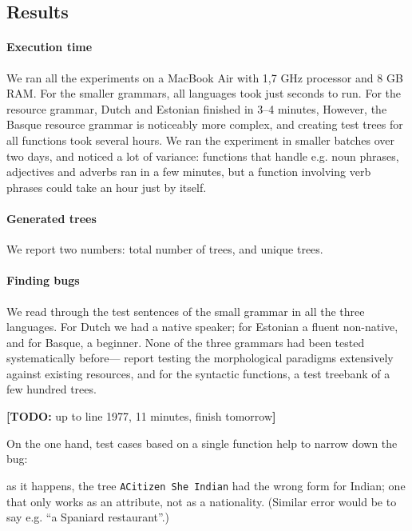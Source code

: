 \documentclass[11pt]{article}
\def\t#1{\texttt{#1}}
\newcommand{\todo}[1]{{\color{cyan}\textbf{[TODO: }#1\textbf{]}}}
\begin{document}
\subsection{Results}

\paragraph{Execution time} We ran all the experiments on a MacBook Air with 1,7 GHz processor and 8 GB RAM.
For the smaller grammars, all languages took just
seconds to run. For the resource grammar, Dutch and Estonian finished in
3--4 minutes,
However, the Basque resource grammar is noticeably more complex, and
creating test trees for all functions took several hours. We ran the
experiment in smaller batches over two days, and noticed a lot of
variance: functions that handle e.g. noun phrases, adjectives and
adverbs ran in a few minutes, but a function involving verb phrases
could take an hour just by itself. 

\paragraph{Generated trees} 

We report two numbers: total number of trees, and unique trees. 


\paragraph{Finding bugs} 
We read through the test sentences of the small grammar in all the
three languages. 
For Dutch we had a native speaker; for Estonian a fluent non-native,
and for Basque, a beginner. None of the three grammars had been tested
systematically before---\cite{listenmaa_kaljurand2014} report testing
the morphological paradigms extensively against existing resources,
and for the syntactic functions, a test treebank of a few hundred trees.

\todo{up to line 1977, 11 minutes, finish tomorrow}

On the one hand, test cases based on a single function help to narrow
down the bug: 

as it happens, the tree \t{ACitizen She Indian} had the
wrong form for Indian; one that only works as an attribute, not as a
nationality. (Similar error would be to say e.g. ``a Spaniard
restaurant''.)
\end{document}
